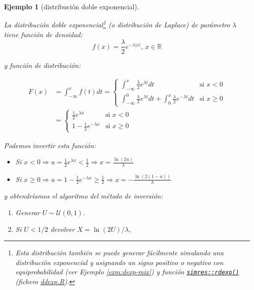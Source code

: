 \documentclass[
  spanish,
  10pt,
]{book}
\theoremstyle{break}
\newtheorem{example}{Ejemplo}[chapter]
\theoremstyle{nonumberplain}
\let\oldfootnote\footnote
\renewcommand\footnote[1]{\oldfootnote{\hspace{2mm}#1}}
\begin{document}
\begin{example}[distribución doble exponencial]
\protect\hypertarget{exm:ddexp}{}\label{exm:ddexp}

La distribución doble exponencial\footnote{Esta distribución también se puede generar fácilmente simulando una distribución exponencial y asignando un signo positivo o negativo con equiprobabilidad (ver Ejemplo \ref{exm:dexp-mix}) y función \href{https://rubenfcasal.github.io/simres/reference/ddexp.html}{\texttt{simres::rdexp()}} (fichero \href{R/ddexp.R}{\emph{ddexp.R}}).} (o distribución de Laplace) de parámetro \(\lambda\) tiene función de densidad:
\[f(x) = \frac{\lambda}{2} e^{-\lambda |x|} \text{, } x \in \mathbb{R}\]

y función de distribución:

\[
\begin{aligned}
F(x) & =\int_{-\infty}^{x}f(t) dt
= \left\{
\begin{array}{ll}
\int_{-\infty}^{x} \frac{\lambda}{2}e^{\lambda t} dt & \text{si } x<0 \\
\int_{-\infty}^{0} \frac{\lambda}{2}e^{\lambda t} dt + 
\int_{0}^{x} \frac{\lambda}{2}e^{-\lambda t} dt & \text{si } x\geq0
\end{array}
\right. \\
&= \left\{
\begin{array}{ll}
\frac{1}{2}e^{\lambda x} & \text{si } x<0 \\
1-\frac{1}{2}e^{-\lambda x} & \text{si } x\geq0
\end{array}
\right.
\end{aligned}
\]

Podemos invertir esta función:

\begin{itemize}
\item
  Si \(x < 0 \Rightarrow u = \frac{1}{2}e^{\lambda x} < \frac{1}{2} \Rightarrow x = \frac{\ln \left( 2u\right) }{ \lambda }\)
\item
  Si \(x \geq 0 \Rightarrow u = 1-\frac{1}{2}e^{-\lambda x} \geq \frac{1}{2} \Rightarrow x =-\frac{\ln \left( 2(1-u)\right) }{ \lambda }\)
\end{itemize}

y obtendríamos el algoritmo del método de inversión:

\begin{enumerate}
\def\labelenumi{\arabic{enumi}.}
\item
  Generar \(U \sim \mathcal{U}(0, 1)\).
\item
  Si \(U < 1/2\) devolver \(X = \ln \left( 2U \right)/\lambda\),


\end{enumerate}
\end{example}
\end{document}
